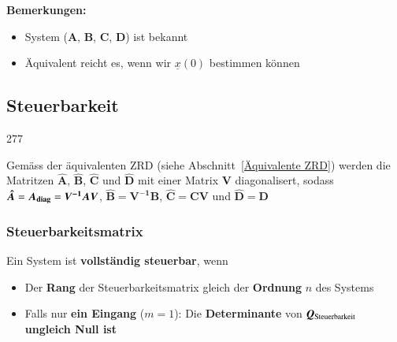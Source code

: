 \vspace{0.2cm}
\textbf{Bemerkungen: }
\begin{itemize}
    \item System ($\bm{A}$, $\bm{B}$, $\bm{C}$, $\bm{D}$) ist bekannt 
    \item Äquivalent reicht es, wenn wir $\underline{x}(0)$ bestimmen können
\end{itemize}
    

\subsection{Steuerbarkeit}{277}

Gemäss der äquivalenten ZRD (siehe Abschnitt~\ref{Äquivalente ZRD}) werden die Matritzen $\bm{\hat{A}}$,
$\bm{\hat{B}}$, $\bm{\hat{C}}$ und $\bm{\hat{D}}$ mit einer Matrix $\bm{V}$ diagonalisert, sodass 
$\bm{\hat{A}} = \bm{A_{\rm diag}} = \bm{V^{-1} A V}$, $\bm{\hat{B}} = \bm{V^{-1} B}$, 
$\bm{\hat{C}} = \bm{C V}$ und $\bm{\hat{D}} = \bm{D}$

\vspace{0.2cm}

\vspace{0.2cm}



\subsubsection{Steuerbarkeitsmatrix}

Ein System ist \textbf{vollständig steuerbar}, wenn
\begin{itemize}
    \item Der \textbf{Rang} der Steuerbarkeitsmatrix gleich der \textbf{Ordnung} $n$ des Systems
    \item Falls nur \textbf{ein Eingang} ($m = 1$): Die \textbf{Determinante} von $\bm{Q}_{\rm Steuerbarkeit}$ 
        \textbf{ungleich Null ist}
\end{itemize}

